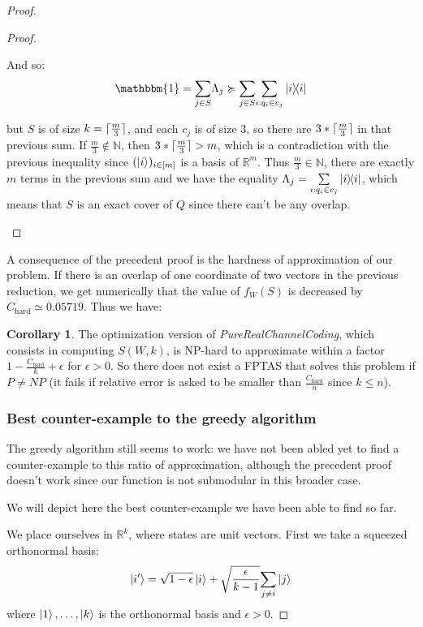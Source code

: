 \documentclass{article}
\theoremstyle{definition}
\newtheorem{cor}[theo]{Corollary}
\theoremstyle{remark}
\DeclarePairedDelimiter\ceil{\lceil}{\rceil}
\begin{document}
\begin{proof}
\begin{proof}
\begin{itemize}
         And so:
         \[\mathbbm{1} = \underset{j \in S}{\sum} \Lambda_j \succcurlyeq \underset{j \in S}{\sum}\underset{i:q_i \in c_j}{\sum} \dyad{i}\]

         but $S$ is of size $k = \ceil{\frac{m}{3}}$, and each $c_j$ is of size 3, so there are $3*\ceil{\frac{m}{3}}$ in that previous sum. If $\frac{m}{3} \not\in \mathbb{N}$, then $3*\ceil{\frac{m}{3}} > m$, which is a contradiction with the previous inequality since $(\ket{i})_{i \in [m]}$ is a basis of $\mathbb{R}^m$. Thus $\frac{m}{3} \in \mathbb{N}$, there are exactly $m$ terms in the previous sum and we have the equality $\Lambda_j = \underset{i:q_i \in c_j}{\sum} \dyad{i}$, which means that $S$ is an exact cover of $Q$ since there can't be any overlap.
       \end{itemize}
     \end{proof}

     A consequence of the precedent proof is the hardness of approximation of our problem. If there is an overlap of one coordinate of two vectors in the previous reduction, we get numerically that the value of $f_W(S)$ is decreased by $C_{\text{hard}} \simeq 0.05719$. Thus we have:

     \begin{cor}
       The optimization version of \emph{PureRealChannelCoding}, which consists in computing $S(W,k)$, is NP-hard to approximate within a factor $1-\frac{C_{\text{hard}}}{k} + \epsilon$ for $\epsilon > 0$. So there does not exist a FPTAS that solves this problem if $P \not= NP$ (it fails if relative error is asked to be smaller than $\frac{C_{\text{hard}}}{n}$ since $k \leq n$).
     \end{cor}
     
     \subsubsection{Best counter-example to the greedy algorithm}
     The greedy algorithm still seems to work: we have not been abled yet to find a counter-example to this ratio of approximation, although the precedent proof doesn't work since our function is not submodular in this broader case.

     We will depict here the best counter-example we have been able to find so far.

     We place ourselves in $\mathbb{R}^k$, where states are unit vectors.
     First we take a squeezed orthonormal basis:
     \[ \ket{i'} = \sqrt{1-\epsilon}\ket{i} + \sqrt{\frac{\epsilon}{k-1}}\underset{j \not= i}{\sum}\ket{j}\]
     where $\ket{1},\ldots,\ket{k}$ is the orthonormal basis and $\epsilon > 0$.


\end{proof}
\end{document}
